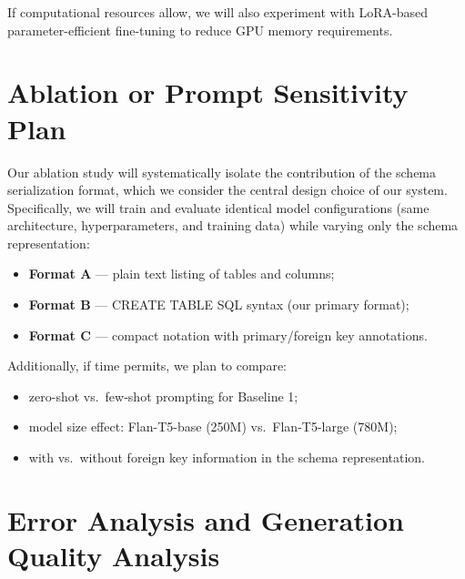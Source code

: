 \documentclass[11pt,a4paper]{article}
\begin{document}
If computational resources allow, we will also experiment with LoRA-based
parameter-efficient fine-tuning to reduce GPU memory requirements.


\section{Ablation or Prompt Sensitivity Plan}


Our ablation study will systematically isolate the contribution of the
schema serialization format, which we consider the central design choice
of our system.
Specifically, we will train and evaluate identical model configurations
(same architecture, hyperparameters, and training data) while varying only
the schema representation:

\begin{itemize}[noitemsep]
  \item \textbf{Format A} — plain text listing of tables and columns;
  \item \textbf{Format B} — CREATE TABLE SQL syntax (our primary format);
  \item \textbf{Format C} — compact notation with primary/foreign key annotations.
\end{itemize}

Additionally, if time permits, we plan to compare:
\begin{itemize}[noitemsep]
  \item zero-shot vs.\ few-shot prompting for Baseline 1;
  \item model size effect: Flan-T5-base (250M) vs.\ Flan-T5-large (780M);
  \item with vs.\ without foreign key information in the schema representation.
\end{itemize}


\section{Error Analysis and Generation Quality Analysis}
\end{document}
